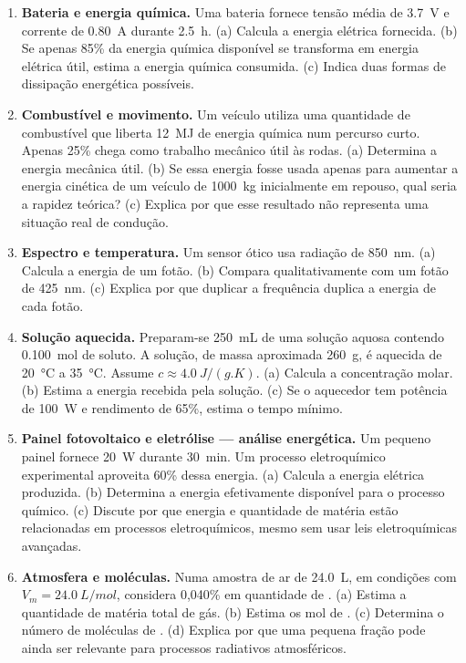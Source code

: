 \documentclass[11pt,a4paper,oneside]{book}
\begin{document}
\begin{exercicios}[title=Desafios integradores]
\begin{enumerate}
  \item \textbf{Bateria e energia química.} Uma bateria fornece tensão média de \SI{3.7}{V} e corrente de \SI{0.80}{A} durante \SI{2.5}{h}. (a) Calcula a energia elétrica fornecida. (b) Se apenas 85\% da energia química disponível se transforma em energia elétrica útil, estima a energia química consumida. (c) Indica duas formas de dissipação energética possíveis.

  \item \textbf{Combustível e movimento.} Um veículo utiliza uma quantidade de combustível que liberta \SI{12}{MJ} de energia química num percurso curto. Apenas 25\% chega como trabalho mecânico útil às rodas. (a) Determina a energia mecânica útil. (b) Se essa energia fosse usada apenas para aumentar a energia cinética de um veículo de \SI{1000}{kg} inicialmente em repouso, qual seria a rapidez teórica? (c) Explica por que esse resultado não representa uma situação real de condução.

  \item \textbf{Espectro e temperatura.} Um sensor ótico usa radiação de \SI{850}{nm}. (a) Calcula a energia de um fotão. (b) Compara qualitativamente com um fotão de \SI{425}{nm}. (c) Explica por que duplicar a frequência duplica a energia de cada fotão.

  \item \textbf{Solução aquecida.} Preparam-se \SI{250}{mL} de uma solução aquosa contendo \SI{0.100}{mol} de soluto. A solução, de massa aproximada \SI{260}{g}, é aquecida de \SI{20}{\celsius} a \SI{35}{\celsius}. Assume $c\approx\SI{4.0}{J/(g.K)}$. (a) Calcula a concentração molar. (b) Estima a energia recebida pela solução. (c) Se o aquecedor tem potência de \SI{100}{W} e rendimento de 65\%, estima o tempo mínimo.

  \item \textbf{Painel fotovoltaico e eletrólise — análise energética.} Um pequeno painel fornece \SI{20}{W} durante \SI{30}{min}. Um processo eletroquímico experimental aproveita 60\% dessa energia. (a) Calcula a energia elétrica produzida. (b) Determina a energia efetivamente disponível para o processo químico. (c) Discute por que energia e quantidade de matéria estão relacionadas em processos eletroquímicos, mesmo sem usar leis eletroquímicas avançadas.

  \item \textbf{Atmosfera e moléculas.} Numa amostra de ar de \SI{24.0}{L}, em condições com $V_m=\SI{24.0}{L/mol}$, considera 0,040\% em quantidade de . (a) Estima a quantidade de matéria total de gás. (b) Estima os mol de . (c) Determina o número de moléculas de . (d) Explica por que uma pequena fração pode ainda ser relevante para processos radiativos atmosféricos.


\end{enumerate}
\end{exercicios}
\end{document}
